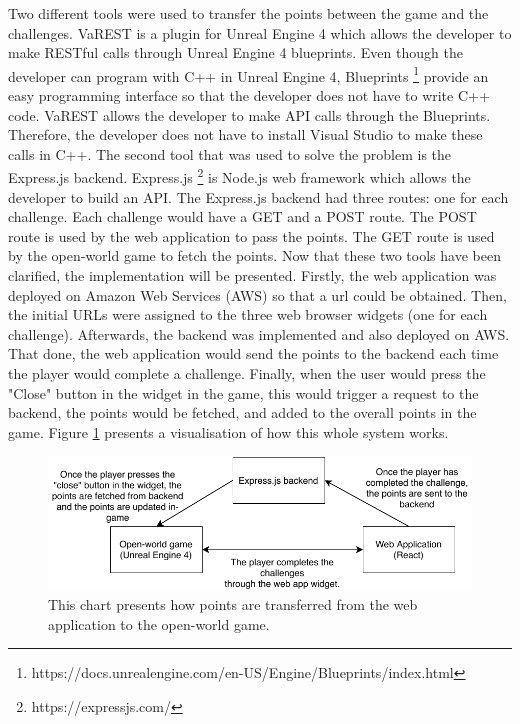 \documentclass{l4proj}
\begin{document}
Two different tools were used to transfer the points between the game and the challenges.
VaREST is a plugin for Unreal Engine 4 which allows the developer to make RESTful calls through Unreal Engine 4 blueprints.
Even though the developer can program with C++ in Unreal Engine 4, 
Blueprints \footnote{https://docs.unrealengine.com/en-US/Engine/Blueprints/index.html} 
provide an easy programming interface so that the developer does not have to write C++ code.
VaREST allows the developer to make API calls through the Blueprints. 
Therefore, the developer does not have to install Visual Studio to make these calls in C++.
The second tool that was used to solve the problem is the Express.js backend.
Express.js \footnote{https://expressjs.com/} is Node.js web framework which allows the developer to build an API.
The Express.js backend had three routes: one for each challenge. Each challenge would have a GET and a POST route.
The POST route is used by the web application to pass the points. 
The GET route is used by the open-world game to fetch the points.
Now that these two tools have been clarified, the implementation will be presented.
Firstly, the web application was deployed on Amazon Web Services (AWS) so that a url could be obtained.
Then, the initial URLs were assigned to the three web browser widgets (one for each challenge).
Afterwards, the backend was implemented and also deployed on AWS.
That done, the web application would send the points to the backend each time the player would complete a challenge.
Finally, when the user would press the "Close" button in the widget in the game, 
this would trigger a request to the backend, the points would be fetched, and added to the overall points in the game.
Figure \ref{fig:pointsImp} presents a visualisation of how this whole system works.

\begin{figure}[b]
    \centering
    \includegraphics[width=\textwidth, frame]{images/PointsImplementation.pdf}
    \caption{This chart presents how points are transferred from the web application to the open-world game.}
    \label{fig:pointsImp}
\end{figure}
\end{document}
